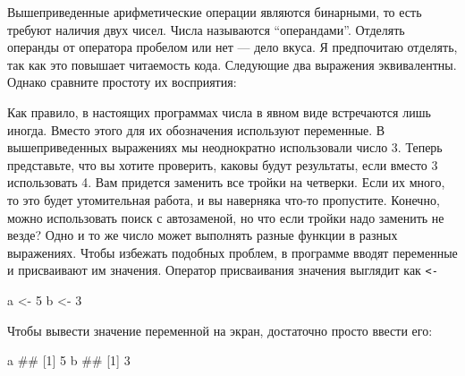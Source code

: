 \documentclass[]{book}
\newenvironment{Shaded}{\begin{snugshade}}{\end{snugshade}}
\newcommand{\DecValTok}[1]{\textcolor[rgb]{0.00,0.00,0.81}{#1}}
\newcommand{\StringTok}[1]{\textcolor[rgb]{0.31,0.60,0.02}{#1}}
\newcommand{\OperatorTok}[1]{\textcolor[rgb]{0.81,0.36,0.00}{\textbf{#1}}}
\newcommand{\NormalTok}[1]{#1}
\begin{document}
Вышеприведенные арифметические операции являются бинарными, то есть
требуют наличия двух чисел. Числа называются ``операндами''. Отделять
операнды от оператора пробелом или нет --- дело вкуса. Я предпочитаю
отделять, так как это повышает читаемость кода. Следующие два выражения
эквивалентны. Однако сравните простоту их восприятия:

\begin{Shaded}
\end{Shaded}

\begin{Shaded}
\end{Shaded}

Как правило, в настоящих программах числа в явном виде встречаются лишь
иногда. Вместо этого для их обозначения используют переменные. В
вышеприведенных выражениях мы неоднократно использовали число 3. Теперь
представьте, что вы хотите проверить, каковы будут результаты, если
вместо 3 использовать 4. Вам придется заменить все тройки на четверки.
Если их много, то это будет утомительная работа, и вы наверняка что-то
пропустите. Конечно, можно использовать поиск с автозаменой, но что если
тройки надо заменить не везде? Одно и то же число может выполнять разные
функции в разных выражениях. Чтобы избежать подобных проблем, в
программе вводят переменные и присваивают им значения. Оператор
присваивания значения выглядит как \texttt{\textless{}-}

\begin{Shaded}
\begin{Highlighting}[]
\NormalTok{a <-}\StringTok{ }\DecValTok{5}
\NormalTok{b <-}\StringTok{ }\DecValTok{3}
\end{Highlighting}
\end{Shaded}

Чтобы вывести значение переменной на экран, достаточно просто ввести
его:

\begin{Shaded}
\begin{Highlighting}[]
\NormalTok{a}
\NormalTok{## [1] 5}
\NormalTok{b}
\NormalTok{## [1] 3}
\end{Highlighting}
\end{Shaded}
\end{document}
